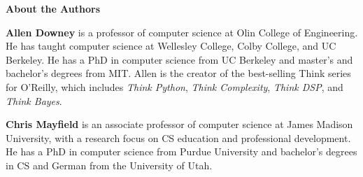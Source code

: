 \documentclass[12pt]{book}
\theoremstyle{exercise}
\begin{document}
\newpage
\thispagestyle{empty}

\vspace*{64pt}

{\bf\huge About the Authors}

\vspace*{40pt}

{\bf Allen Downey} is a professor of computer science at Olin College of Engineering.
He has taught computer science at Wellesley College, Colby College, and UC Berkeley.
He has a PhD in computer science from UC Berkeley and master's and bachelor's degrees from MIT.
Allen is the creator of the best-selling Think series for O'Reilly, which includes {\it Think Python}, {\it Think Complexity}, {\it Think DSP}, and {\it Think Bayes}.

{\bf Chris Mayfield} is an associate professor of computer science at James Madison University, with a research focus on CS education and professional development.
He has a PhD in computer science from Purdue University and bachelor's degrees in CS and German from the University of Utah.

\fi
\end{document}
